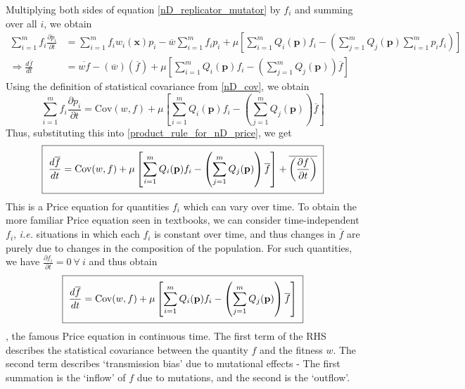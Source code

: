 Multiplying both sides of equation \eqref{nD_replicator_mutator} by $f_i$ and summing over all $i$, we obtain
\begin{align*}
\sum\limits_{i=1}^{m}f_i\frac{\partial p_i}{\partial t} &= \sum\limits_{i=1}^{m}f_iw_i(\mathbf{x})p_i - \overline{w}\sum\limits_{i=1}^{m}f_ip_i + \mu\left[\sum\limits_{i=1}^{m}Q_i(\mathbf{p})f_i - \left(\sum\limits_{j=1}^{m}Q_j(\mathbf{p})\sum\limits_{i=1}^{m}p_if_i\right)\right]\\
\Rightarrow \frac{d\overline{f}}{dt} &= \overline{wf}-(\overline{w})(\overline{f}) + \mu\left[\sum\limits_{i=1}^{m}Q_i(\mathbf{p})f_i - \left(\sum\limits_{j=1}^{m}Q_j(\mathbf{p})\right)\overline{f}\right]
\end{align*}
Using the definition of statistical covariance from \eqref{nD_cov}, we obtain
\begin{equation}
\sum\limits_{i=1}^{m}f_i\frac{\partial p_i}{\partial t} = \mathrm{Cov}(w,f) + \mu\left[\sum\limits_{i=1}^{m}Q_i(\mathbf{p})f_i - \left(\sum\limits_{j=1}^{m}Q_j(\mathbf{p})\right)\overline{f}\right] 
\end{equation}
Thus, substituting this into \eqref{product_rule_for_nD_price}, we get
\begin{equation}
\label{nD_Price_time_dependent}
\setlength{\fboxsep}{2\fboxsep}\boxed{\frac{d\overline{f}}{dt} = \mathrm{Cov}(w,f) + \mu\left[\sum\limits_{i=1}^{m}Q_i(\mathbf{p})f_i - \left(\sum\limits_{j=1}^{m}Q_j(\mathbf{p})\right)\overline{f}\right] + \overline{\left(\frac{\partial f}{\partial t}\right)}}
\end{equation}
This is a Price equation for quantities $f_i$ which can vary over time. To obtain the more familiar Price equation seen in textbooks, we can consider time-independent $f_i$, \emph{i.e.} situations in which each $f_i$ is constant over time, and thus changes in $\overline{f}$ are purely due to changes in the composition of the population. For such quantities, we have $\frac{\partial f_i}{\partial t} = 0 \ \forall \ i$ and thus obtain 
\begin{equation}
\label{nD_Price}
\setlength{\fboxsep}{2\fboxsep}\boxed{
	\frac{d\overline{f}}{dt} = \mathrm{Cov}(w,f) + \mu\left[\sum\limits_{i=1}^{m}Q_i(\mathbf{p})f_i - \left(\sum\limits_{j=1}^{m}Q_j(\mathbf{p})\right)\overline{f}\right]}
\end{equation}
, the famous Price equation in continuous time. The first term of the RHS describes the statistical covariance between the quantity $f$ and the fitness $w$. The second term describes `transmission bias' due to mutational effects - The first summation is the `inflow' of $f$ due to mutations, and the second is the `outflow'.

